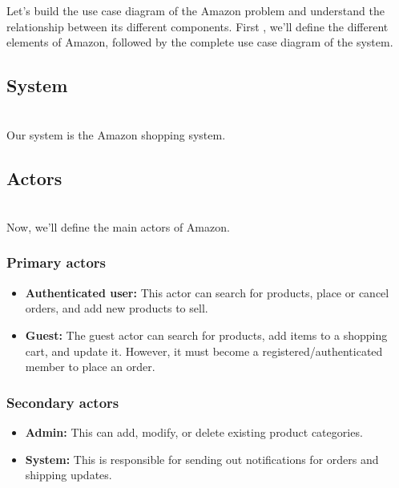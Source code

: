 

Let's build the use case diagram of the Amazon problem and understand the relationship between its different components. First , we'll define the different elements of Amazon, followed by the complete use case diagram of the system.

\subsection{System}\label{-9rzh7pLAEI0n026o5LKT}
\\
Our system is the Amazon shopping system.

\subsection{Actors}\label{22pOXYexMhtpXaHxI07W2}
\\
Now, we'll define the main actors of Amazon.

\subsubsection{Primary actors}\label{EUMnxD3bTWONh3VGz8Vj4}

\begin{itemize}
\item
\protect{}\label{L3EmUC6yyhodhGST-tNcQ}
\textbf{Authenticated user:} This actor can search for products, place or cancel orders, and add new products to sell.
\item
\protect{}\label{EbKaLneMgEttOBhwlK9uw}
\textbf{Guest:} The guest actor can search for products, add items to a shopping cart, and update it. However, it must become a registered/authenticated member to place an order.
\end{itemize}

\subsubsection{Secondary actors}\label{cxUU1W8j2tMHX87jiDO07}

\begin{itemize}
\item
\protect{}\label{Eo_CX1TjmfNVxudUapKhb}
\textbf{Admin:} This can add, modify, or delete existing product categories.
\item
\protect{}\label{mftVBh-86-_JeMZ_q7UZV}
\textbf{System:} This is responsible for sending out notifications for orders and shipping updates.
\end{itemize}

